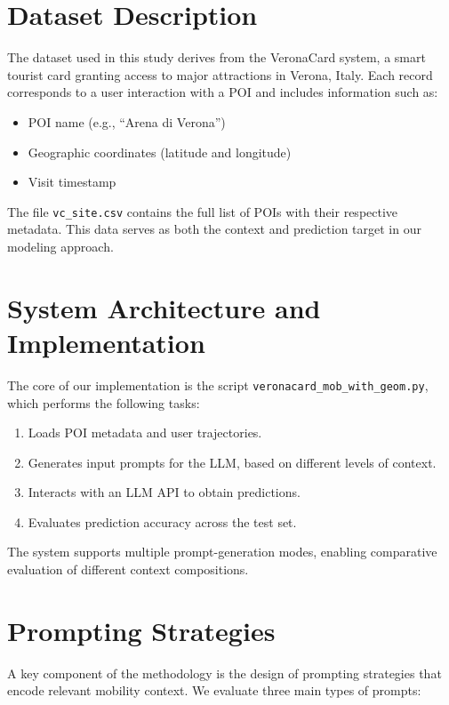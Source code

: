 \documentclass[a4paper,12pt]{article}
\begin{document}
\section{Dataset Description}

The dataset used in this study derives from the VeronaCard system, a smart tourist card granting access to major attractions in Verona, Italy. Each record corresponds to a user interaction with a POI and includes information such as:

\begin{itemize}
    \item POI name (e.g., ``Arena di Verona'')
    \item Geographic coordinates (latitude and longitude)
    \item Visit timestamp
\end{itemize}

The file \texttt{vc\_site.csv} contains the full list of POIs with their respective metadata. This data serves as both the context and prediction target in our modeling approach. \par

\section{System Architecture and Implementation}

The core of our implementation is the script \texttt{veronacard\_mob\_with\_geom.py}, which performs the following tasks:

\begin{enumerate}
    \item Loads POI metadata and user trajectories.
    \item Generates input prompts for the LLM, based on different levels of context.
    \item Interacts with an LLM API to obtain predictions.
    \item Evaluates prediction accuracy across the test set.
\end{enumerate}
\par
The system supports multiple prompt-generation modes, enabling comparative evaluation of different context compositions.

\section{Prompting Strategies}

A key component of the methodology is the design of prompting strategies that encode relevant mobility context. We evaluate three main types of prompts:
\end{document}
